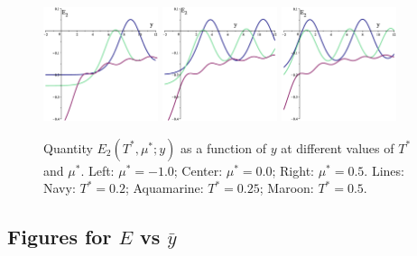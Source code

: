 \documentclass[12pt]{article}
\numberwithin{equation}{section}
\begin{document}
	\begin{figure}[htbp]
		\includegraphics[width=0.3\textwidth,angle=0]{images/E2y_vs_y_b1}
		\hfill
		\includegraphics[width=0.3\textwidth,angle=0]{images/E2y_vs_y_b2}
		\hfill
		\includegraphics[width=0.3\textwidth,angle=0]{images/E2y_vs_y_b3}
		\vfill
		\parbox{0.95\textwidth}{\caption{\label{fig:E2y_vs_y_b} Quantity $E_2(T^*,\mu^*;y)$ as a function of $y$ at different values of $T^*$ and $\mu^*$. Left: $\mu^*=-1.0$; Center: $\mu^*=0.0$; Right: $\mu^*=0.5$. Lines: Navy: $T^*=0.2$; Aquamarine: $T^*=0.25$; Maroon: $T^*=0.5$.}}
		
	\end{figure}
	
	\pagebreak
	\subsection{Figures for $E$ vs $\bar{y}$}
	
\end{document}
